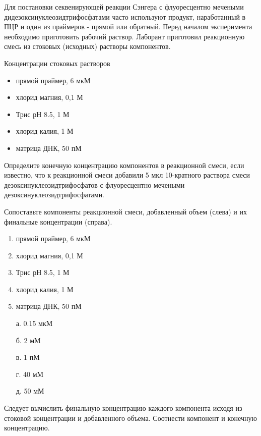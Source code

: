 
Для постановки секвенирующей реакции Сэнгера с флуоресцентно мечеными дидезоксинуклеозидтрифосфатами часто используют продукт, наработанный в ПЦР и один из праймеров - прямой или обратный. Перед началом эксперимента необходимо приготовить рабочий раствор. Лаборант приготовил реакционную смесь из стоковых (исходных) растворы компонентов.

Концентрации стоковых растворов

\begin{itemize}
    \item прямой праймер, 6 мкМ
    \item хлорид магния, 0,1 М
    \item Трис рН 8.5, 1 М
    \item хлорид калия, 1 М
    \item матрица ДНК, 50 пМ
\end{itemize}

Определите конечную концентрацию компонентов в реакционной смеси, если известно, что к реакционной смеси добавили 5 мкл 10-кратного раствора смеси дезоксинуклеозидтрифосфатов с флуоресцентно мечеными дезоксинуклеозидтрифосфатами.

Сопоставьте компоненты реакционной смеси, добавленный объем (слева) и их финальные концентрации (справа).

\begin{multicols}{2}
    {
        \begin{enumerate}
            \item прямой праймер, 6 мкМ
            \item хлорид магния, 0,1 М
            \item Трис рН 8.5, 1 М
            \item хлорид калия, 1 М
            \item матрица ДНК, 50 пМ
        \end{enumerate}
    }

    {
        \begin{enumerate}
            \item[а.] 0.15 мкМ
            \item[б.] 2 мМ
            \item[в.] 1 пМ
            \item[г.] 40 мМ
            \item[д.] 50 мМ
        \end{enumerate}
    }
    
\end{multicols}

\explanationSection

Следует вычислить финальную концентрацию каждого компонента исходя из стоковой концентрации и добавленного объема. Соотнести компонент и конечную концентрацию.

